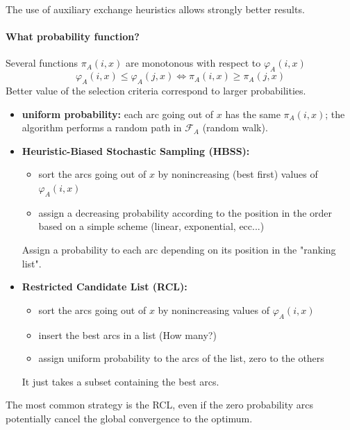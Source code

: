 The use of auxiliary exchange heuristics allows strongly better results.\\

\paragraph{What probability function?} Several functions $\pi_A (i, x)$ are monotonous with respect to $\varphi_A (i, x)$
$$ \varphi_A (i,x) \leq \varphi_A (j,x) \Leftrightarrow \pi_A (i,x) \geq \pi_A (j,x) $$
Better value of the selection criteria correspond to larger probabilities.

\begin{itemize}
	\item \textbf{uniform probability:} each arc going out of $x$ has the same $\pi_A (i, x)$; the algorithm performs a random path in $\mathcal{F}_A$ (random walk).\\
	
	\item \textbf{Heuristic-Biased Stochastic Sampling (HBSS):}
	\begin{itemize}
		\item sort the arcs going out of $x$ by nonincreasing (best first) values of $\varphi_A (i, x)$
		\item assign a decreasing probability according to the position in the order based on a simple scheme (linear, exponential, ecc...)
	\end{itemize}
	Assign a probability to each arc depending on its position in the "ranking list".\\
	
	\item \textbf{Restricted Candidate List (RCL):}
	\begin{itemize}
		\item sort the arcs going out of $x$ by nonincreasing values of $\varphi_A (i, x)$
		\item insert the best arcs in a list (How many?)
		\item assign uniform probability to the arcs of the list, zero to the others
	\end{itemize}
	It just takes a subset containing the best arcs.\\
\end{itemize}

The most common strategy is the RCL, even if the zero probability arcs potentially cancel the global convergence to the optimum.

\newpage

